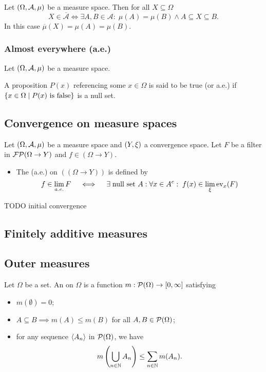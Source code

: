 \begin{proposition}
Let $\left( \Omega, \mathcal{A}, \mu \right)$ be a measure space. Then for all $X\subseteq \Omega$
\[ X\in \overline{\mathcal{A}} \iff \exists A,B \in \mathcal{A}: \; \mu(A) = \mu(B) \land A \subseteq X\subseteq B. \]
In this case $\overline{\mu}(X) = \mu(A) = \mu(B)$.
\end{proposition}

\subsubsection{Almost everywhere (a.e.)}
\begin{definition}
Let $\left( \Omega, \mathcal{A}, \mu \right)$ be a measure space.

A proposition $P(x)$ referencing some $x\in\Omega$ is said to be true  (or a.e.) if $\left\{ x\in\Omega \;\middle|\; \text{$P(x)$ is false} \right\}$ is a null set.
\end{definition}

\subsection{Convergence on measure spaces}
\begin{definition}
Let $\left( \Omega, \mathcal{A}, \mu \right)$ be a measure space and $\left( Y,\xi \right)$ a convergence space. Let $F$ be a filter in $\operatorname{\mathcal{FP}}(\Omega\to Y)$ and $f\in (\Omega\to Y)$.
\begin{itemize}
\item The  (a.e.) on $((\Omega\to Y))$ is defined by
\[ f\in \lim_{a.e.} F \quad\iff\quad \exists \;\text{null set $A$}: \forall x\in A^c: \; f(x) \in \lim_\xi \operatorname{ev}_x(F) \]
\end{itemize}
\end{definition}
TODO initial convergence

\subsection{Finitely additive measures}

\subsection{Outer measures}
\begin{definition}
Let $\Omega$ be a set. An  on $\Omega$ is a function $m: \operatorname{\mathcal{P}}(\Omega) \to [0,\infty]$ satisfying
\begin{itemize}
\item $m(\emptyset) = 0$;
\item $A\subseteq B \implies m(A) \leq m(B)$ for all $A,B\in\operatorname{\mathcal{P}}(\Omega)$;
\item for any sequence $\left\langle A_n \right\rangle$ in $\operatorname{\mathcal{P}}(\Omega)$, we have
\[ m\left(\bigcup_{n\in\mathbb{N}}A_n\right) \leq \sum_{n\in\mathbb{N}}m(A_n). \]
\end{itemize}
\end{definition}

